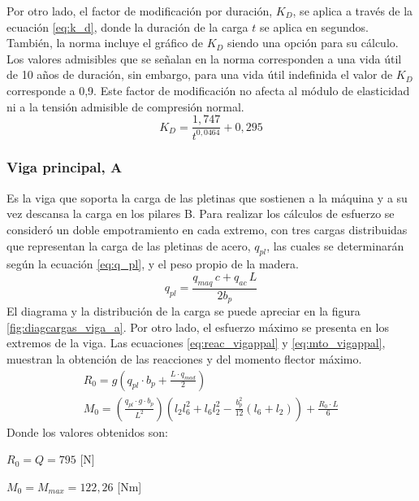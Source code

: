 Por otro lado, el factor de modificación por duración, $K_D$, se aplica a través de la ecuación \ref{eq:k_d}, donde la duración de la carga $t$ se aplica en segundos. También, la norma incluye el gráfico de $K_D$ siendo una opción para su cálculo. Los valores admisibles que se señalan en la norma corresponden a una vida útil de 10 años de duración, sin embargo, para una vida útil indefinida el valor de $K_D$ corresponde a 0,9. Este factor de modificación no afecta al módulo de elasticidad ni a la tensión admisible de compresión normal.
\begin{equation} \label{eq:k_d}
	K_D = \frac{1,747}{t^{0,0464}} + 0,295
\end{equation}

\subsubsection{Viga principal, A}
Es la viga que soporta la carga de las pletinas que sostienen a la máquina y a su vez descansa la carga en los pilares B. Para realizar los cálculos de esfuerzo se consideró un doble empotramiento en cada extremo, con tres cargas distribuidas que representan la carga de las pletinas de acero, $q_{pl}$, las cuales se determinarán según la ecuación \ref{eq:q_pl}, y el peso propio de la madera.
\begin{equation}\label{eq:q_pl}
	q_{pl} = \frac{q_{maq}\,c + q_{ac}\,L}{2b_p}
\end{equation}
El diagrama y la distribución de la carga se puede apreciar en la figura \ref{fig:diagcargas_viga_a}. Por otro lado, el esfuerzo máximo se presenta en los extremos de la viga. Las ecuaciones \ref{eq:reac_vigappal} y \ref{eq:mto_vigappal}, muestran la obtención de las reacciones y del momento flector máximo.
\begin{subequations}
\begin{gather}
	R_0 = g \left( q_{pl}\cdot b_p + \frac{L\cdot q_{mad}}{2}\right) \label{eq:reac_vigappal}\\
	M_0 = \left(\frac{q_{pl}\cdot g\cdot b_p}{L^2}\right) \left(l_2 l_6^2 + l_6 l_2^2 - \frac{b_p^2}{12}\left( l_6 + l_2\right) \right) + \frac{R_0\cdot L}{6} \label{eq:mto_vigappal} 
\end{gather}
\end{subequations}
Donde los valores obtenidos son:
\begin{itemize*}
	\item $R_0 = Q = 795$ [N]
	\item $M_0 = M_{max} = 122,26$ [Nm]
\end{itemize*}
